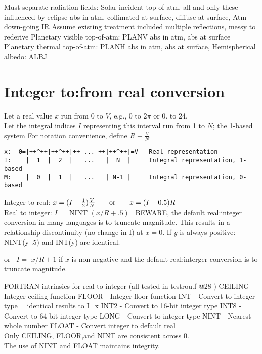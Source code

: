 \documentclass{article}
\begin{document}
Must separate radiation fields:
\qi Solar incident top-of-atm. all and only these influenced by eclipse
\qii  abs in atm,  
\qii  collimated at surface,  
\qii  diffuse at surface,
\qii  [lost]
\qi Atm down-going IR
\qii  Assume existing treatment included multiple reflections, messy to rederive
\qi Planetary visible top-of-atm:  PLANV
\qii  abs in atm, 
\qii  abs at surface
\qii  [lost]
\qi Planetary thermal top-of-atm:  PLANH
\qii  abs in atm,  
\qii  abs at surface,
\qii  [lost]
\qi Hemispherical albedo: ALBJ

\section{Integer to:from real conversion}
Let a real value $x$ run from 0 to $V$, e.g., 0 to $2\pi$ or  0. to 24.
\\ Let the integral indices $I$ representing this interval run from 1 to $N$; the 1-based system
\qi For notation convenience, define $R \equiv \frac{V}{N}$
\vspace{-3.mm} 
\begin{verbatim}
x:  0=|++^++|++^++|++ ... ++|++^++|=V   Real representation
I:    |  1  |  2  |   ...   |  N  |     Integral representation, 1-based
M:    |  0  |  1  |   ...   | N-1 |     Integral representation, 0-based
\end{verbatim}    

Integer to real: $x=(I-\frac{1}{2})\frac{V}{N}  \hspace{7mm} \mathrm{or} \hspace{7mm}  x=(I-0.5)R $
\\ Real to integer:  $I=$ NINT $( x/R +.5 )$ \ 
\qi BEWARE, the default real:integer conversion in many languages is to truncate magnitude. 
\qii This results in a relationship discontinuity (no change in I) at $x=0$.
\qiii If $y$ is always positive: NINT(y-.5) and INT(y) are identical.
 
or \  $I=$ $ x/R + 1$ if $x$ is non-negative and the default real:interger conversion is to truncate magnitude.

FORTRAN intrinsics for real to integer (all tested in testrou.f @28 )
\qi CEILING - Integer ceiling function
\qi FLOOR - Integer floor function
\qi INT - Convert to integer type    \ \ identical results to I=x
\qii INT2 - Convert to 16-bit integer type
\qii INT8 - Convert to 64-bit integer type
\qii LONG - Convert to integer type
\qi NINT - Nearest whole number
\qi FLOAT - Convert integer to default real
\\ Only CEILING, FLOOR,and NINT are consistent across 0. 
\\ The use of NINT and FLOAT maintains integrity. 
\end{document}
